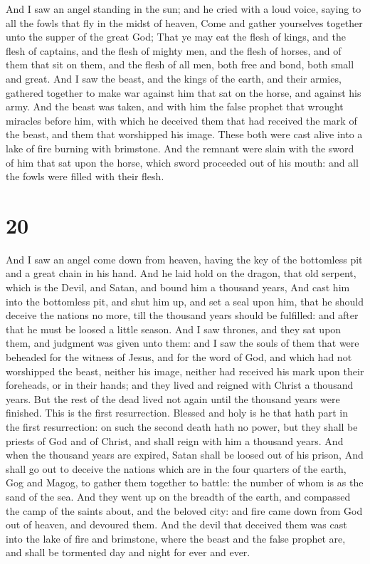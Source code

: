  And I saw an angel standing in the sun; and he cried with
a loud voice, saying to all the fowls that fly in the midst of heaven,
Come and gather yourselves together unto the supper of the great God;
 That ye may eat the flesh of kings, and the flesh of
captains, and the flesh of mighty men, and the flesh of horses, and of
them that sit on them, and the flesh of all men, both free and bond,
both small and great.  And I saw the beast, and the kings
of the earth, and their armies, gathered together to make war against
him that sat on the horse, and against his army.  And the
beast was taken, and with him the false prophet that wrought miracles
before him, with which he deceived them that had received the mark of
the beast, and them that worshipped his image. These both were cast
alive into a lake of fire burning with brimstone.  And the
remnant were slain with the sword of him that sat upon the horse, which
sword proceeded out of his mouth: and all the fowls were filled with
their flesh.

\hypertarget{section-19}{%
\section{20}\label{section-19}}

 And I saw an angel come down from heaven, having the key of
the bottomless pit and a great chain in his hand.  And he
laid hold on the dragon, that old serpent, which is the Devil, and
Satan, and bound him a thousand years,  And cast him into
the bottomless pit, and shut him up, and set a seal upon him, that he
should deceive the nations no more, till the thousand years should be
fulfilled: and after that he must be loosed a little season.
 And I saw thrones, and they sat upon them, and judgment was
given unto them: and I saw the souls of them that were beheaded for the
witness of Jesus, and for the word of God, and which had not worshipped
the beast, neither his image, neither had received his mark upon their
foreheads, or in their hands; and they lived and reigned with Christ a
thousand years.  But the rest of the dead lived not again
until the thousand years were finished. This is the first resurrection.
 Blessed and holy is he that hath part in the first
resurrection: on such the second death hath no power, but they shall be
priests of God and of Christ, and shall reign with him a thousand years.
 And when the thousand years are expired, Satan shall be
loosed out of his prison,  And shall go out to deceive the
nations which are in the four quarters of the earth, Gog and Magog, to
gather them together to battle: the number of whom is as the sand of the
sea.  And they went up on the breadth of the earth, and
compassed the camp of the saints about, and the beloved city: and fire
came down from God out of heaven, and devoured them.  And
the devil that deceived them was cast into the lake of fire and
brimstone, where the beast and the false prophet are, and shall be
tormented day and night for ever and ever.

